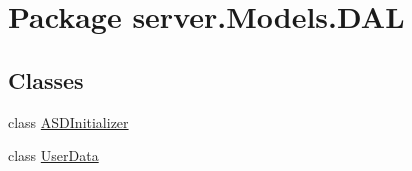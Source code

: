 \hypertarget{namespaceserver_1_1Models_1_1DAL}{\section{Package server.\-Models.\-D\-A\-L}
\label{namespaceserver_1_1Models_1_1DAL}
}
\subsection*{Classes}
\begin{DoxyCompactItemize}
\item 
class \hyperlink{classserver_1_1Models_1_1DAL_1_1ASDInitializer}{A\-S\-D\-Initializer}
\item 
class \hyperlink{classserver_1_1Models_1_1DAL_1_1UserData}{User\-Data}
\end{DoxyCompactItemize}
